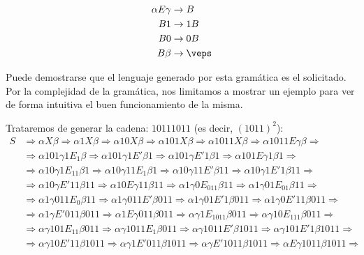 \begin{ejercicio}
\begin{enumerate}
\begin{itemize}
                    \begin{align*}
                        \alpha E\gamma &\rightarrow B \\
                        B1 &\rightarrow 1B \\
                        B0 &\rightarrow 0B \\
                        B\beta &\rightarrow \veps 
                    \end{align*}
            \end{itemize}
            Puede demostrarse que el lenguaje generado por esta gramática es el solicitado. Por la complejidad de la gramática, nos limitamos a mostrar un ejemplo para ver de forma intuitiva el buen funcionamiento de la misma.

            Trataremos de generar la cadena: $10111011$ (es decir, ${(1011)}^{2}$):
            \begin{align*}
                S &\Rightarrow \alpha X \beta \Rightarrow \alpha 1X\beta \Rightarrow \alpha 10X\beta \Rightarrow \alpha101X \beta \Rightarrow \alpha1011X\beta \Rightarrow \alpha1011E\gamma\beta \Rightarrow \\
                  &\Rightarrow \alpha101\gamma1E_1\beta \Rightarrow \alpha101\gamma1E'\beta1 \Rightarrow \alpha101\gamma E'1\beta1 \Rightarrow \alpha101E\gamma1\beta1 \Rightarrow \\
                  &\Rightarrow \alpha10\gamma1E_11\beta1 \Rightarrow \alpha 10\gamma11E_1\beta1 \Rightarrow \alpha 10\gamma11E'\beta11 \Rightarrow \alpha10\gamma1E'1\beta11 \Rightarrow \\
                  &\Rightarrow \alpha10\gamma E'11\beta11 \Rightarrow \alpha10E\gamma11\beta11 \Rightarrow \alpha 1\gamma0E_011\beta11 \Rightarrow \alpha1\gamma01E_01\beta11 \Rightarrow\\
                  &\Rightarrow\alpha1\gamma011E_0\beta11 \Rightarrow \alpha1\gamma011E'\beta011 \Rightarrow \alpha1\gamma01E'1\beta011 \Rightarrow \alpha1\gamma0E'11\beta011 \Rightarrow \\
                  &\Rightarrow \alpha1\gamma E'011\beta011 \Rightarrow \alpha1E\gamma011\beta011 \Rightarrow \alpha\gamma1E_1011\beta011 \Rightarrow \alpha\gamma10E_111\beta011 \Rightarrow \\
                  &\Rightarrow \alpha\gamma101E_11\beta011 \Rightarrow \alpha\gamma1011E_1\beta011 \Rightarrow \alpha\gamma1011E'\beta1011 \Rightarrow \alpha\gamma101E'1\beta1011 \Rightarrow \\
                  &\Rightarrow \alpha\gamma10E'11\beta1011 \Rightarrow \alpha\gamma1E'011\beta1011 \Rightarrow \alpha\gamma E'1011\beta1011 \Rightarrow \alpha E\gamma1011\beta1011 \Rightarrow \\

\end{align*}
\end{enumerate}
\end{ejercicio}
